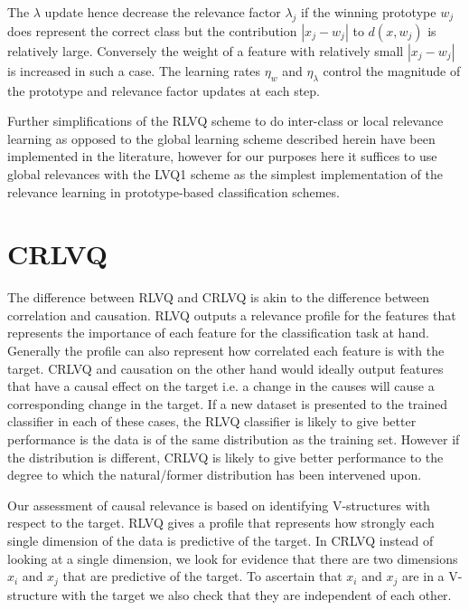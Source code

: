 \documentclass{esannV2}
\begin{document}
The $\lambda$ update hence decrease the relevance factor $\lambda_j$ if the winning prototype $w_j$ does represent the correct class but the contribution $|x_j - w_j|$ to $d(x,w_j)$ is relatively large. Conversely the weight of a feature with relatively small $|x_j - w_j|$ is increased in such a case. The learning rates $\eta_w$ and $\eta_\lambda$ control the magnitude of the prototype and relevance factor updates at each step.

Further simplifications of the RLVQ scheme to do inter-class or local relevance learning as opposed to the global learning scheme described herein have been implemented in the literature, however for our purposes here it suffices to use global relevances with the LVQ1 scheme as the simplest implementation of the relevance learning in prototype-based classification schemes. 

\section{CRLVQ}
\label{sec:CRLVQ}

The difference between RLVQ and CRLVQ is akin to the difference between correlation and causation. RLVQ outputs a relevance profile for the features that represents the importance of each feature for the classification task at hand. Generally the profile can also represent how correlated each feature is with the target. CRLVQ and causation on the other hand would ideally output features that have a causal effect on the target i.e. a change in the causes will cause a corresponding change in the target. If a new dataset is presented to the trained classifier in each of these cases, the RLVQ classifier is likely to give better performance is the data is of the same distribution as the training set. However if the distribution is different, CRLVQ is likely to give better performance to the degree to which the natural/former distribution has been intervened upon.

Our assessment of causal relevance is based on identifying V-structures with respect to the target. RLVQ gives a profile that represents how strongly each single dimension of the data is predictive of the target. In CRLVQ instead of looking at a single dimension, we look for evidence that there are two dimensions $x_i$ and $x_j$ that are predictive of the target. To ascertain that $x_i$ and $x_j$ are in a V-structure with the target we also check that they are independent of each other.
\end{document}
